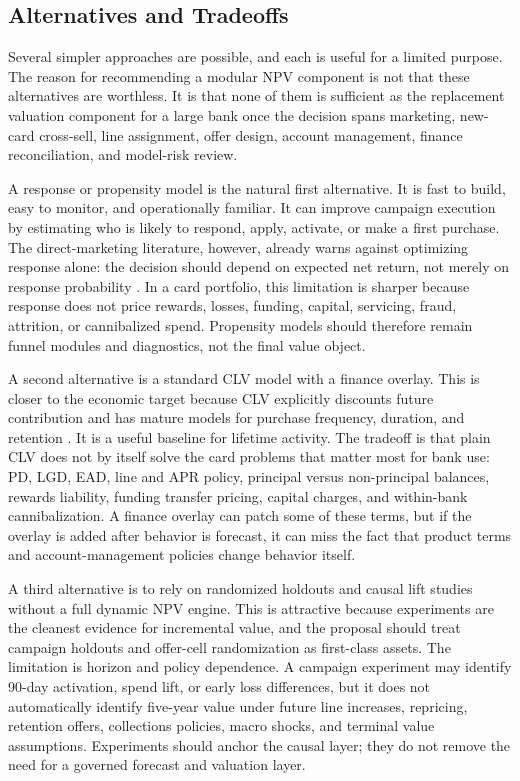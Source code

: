 \documentclass[11pt]{article}
\newcommand{\1}{\mathbf{1}}
\begin{document}
\subsection{Alternatives and Tradeoffs}
\label{sec:alternatives-tradeoffs}

Several simpler approaches are possible, and each is useful for a limited
purpose. The reason for recommending a modular NPV component is not that these
alternatives are worthless. It is that none of them is sufficient as the
replacement valuation component for a large bank once the decision spans
marketing, new-card cross-sell, line assignment, offer design, account
management, finance reconciliation, and model-risk review.

A response or propensity model is the natural first alternative. It is fast to
build, easy to monitor, and operationally familiar. It can improve campaign
execution by estimating who is likely to respond, apply, activate, or make a
first purchase. The direct-marketing literature, however, already warns against
optimizing response alone: the decision should depend on expected net return,
not merely on response probability \citep{bult1995directmail}. In a card
portfolio, this limitation is sharper because response does not price rewards,
losses, funding, capital, servicing, fraud, attrition, or cannibalized spend.
Propensity models should therefore remain funnel modules and diagnostics, not
the final value object.

A second alternative is a standard CLV model with a finance overlay. This is
closer to the economic target because CLV explicitly discounts future
contribution and has mature models for purchase frequency, duration, and
retention \citep{berger1998clv,rust2004return,venkatesan2004clv,
schmittlein1987counting,fader2005bgnbd}. It is a useful baseline for lifetime
activity. The tradeoff is that plain CLV does not by itself solve the card
problems that matter most for bank use: PD, LGD, EAD, line and APR policy,
principal versus non-principal balances, rewards liability, funding transfer
pricing, capital charges, and within-bank cannibalization. A finance overlay
can patch some of these terms, but if the overlay is added after behavior is
forecast, it can miss the fact that product terms and account-management
policies change behavior itself.

A third alternative is to rely on randomized holdouts and causal lift studies
without a full dynamic NPV engine. This is attractive because experiments are
the cleanest evidence for incremental value, and the proposal should treat
campaign holdouts and offer-cell randomization as first-class assets. The
limitation is horizon and policy dependence. A campaign experiment may
identify 90-day activation, spend lift, or early loss differences, but it does
not automatically identify five-year value under future line increases,
repricing, retention offers, collections policies, macro shocks, and terminal
value assumptions. Experiments should anchor the causal layer; they do not
remove the need for a governed forecast and valuation layer.
\end{document}
